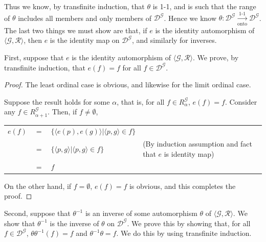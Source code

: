 \documentclass{article}
\theoremstyle{definition}
\begin{document}
Thus we know, by transfinite induction, that $\theta$ is 1-1, and is such that the range of $\theta$ includes all members and only members of 
$\mathcal{D}^\mathcal{G}$. Hence we know $\theta:\mathcal{D}^\mathcal{G}\xrightarrow[\textrm{onto}]{\text{1-1}}\mathcal{D}^\mathcal{G}$. The last 
two things we must show are that, if $e$ is the identity automorphism of $\langle\mathcal{G},\mathcal{R}\rangle$, then $e$ is the identity 
map on $\mathcal{D}^\mathcal{G}$, and similarly for inverses.

First, suppose that $e$ is the identity automorphism of $\langle\mathcal{G},\mathcal{R}\rangle$. We prove, by transfinite induction, 
that $e(f)=f$ for all $f\in\mathcal{D}^\mathcal{G}$.

\begin{proof}

The least ordinal case is obvious, and likewise for the limit ordinal case.

Suppose the result holds for some $\alpha$, that is, for all $f\in R^\mathcal{G}_\alpha$, $e(f)=f$. Consider any 
$f\in R^\mathcal{G}_{\alpha+1}$. Then, if $f\ne\emptyset$, 
\begin{center}
\begin{tabular}{llll}
$e(f)$ & $=$ & $\{\langle e(p),e(g)\rangle|\langle p,g\rangle\in f\}$ \\
& $=$ & $\{\langle p,g\rangle|\langle p,g\rangle\in f\}$ & (By induction assumption and fact that $e$ is identity map) \\
& $=$ & $f$
\end{tabular}
\end{center}
On the other hand, if $f=\emptyset$, $e(f)=f$ is obvious, and this completes the proof.

\end{proof}

Second, suppose that $\theta^{-1}$ is an inverse of some automorphism $\theta$ of 
$\langle\mathcal{G},\mathcal{R}\rangle$. We show that $\theta^{-1}$ is the inverse of 
$\theta$ on $\mathcal{D}^\mathcal{G}$. We prove this by showing that, for all $f\in\mathcal{D}^\mathcal{G}$, 
$\theta\theta^{-1}(f)=f$ and $\theta^{-1}\theta=f$. We do this by using transfinite induction.
\end{document}
